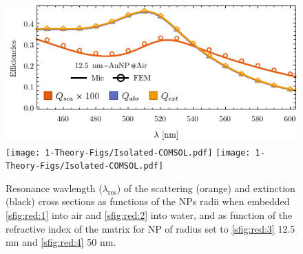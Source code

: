 \begin{figure}\centering
\includegraphics[width = .8\textwidth ]{1-Theory-Figs/Mie-FEM_Air.pdf}\\
\texttt{[image: 1-Theory-Figs/Isolated-COMSOL.pdf]}%
\texttt{[image: 1-Theory-Figs/Isolated-COMSOL.pdf]}%
\caption[Convergence tests: The Meshing]{Resonance wavlength ($\lambda_\text{res}$) of the scattering (orange) and extinction (black) cross sections as functions of the NPs radii when embedded  \ref{sfig:red:1} into air and \ref{sfig:red:2} into water, and as function of the refractive index of the matrix for NP of radius set to  \ref{sfig:red:3} 12.5 nm and \ref{sfig:red:4} 50 nm.}
\end{figure}
